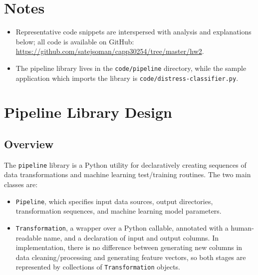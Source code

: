 \documentclass[11pt]{article}
\begin{document}
\begin{titlepage}
\raggedleft\huge\headerfontlt{
\textcolor{darkgray}{Satej Soman\\
CAPP30254: Machine Learning for Public Policy\\
Spring 2019}}

\vspace{240pt}
\Huge\headerfontlt{\textcolor{darkgray}{HW 2\\MACHINE LEARNING PIPELINE}}
\vfill
\normalfont \normalsize
\tableofcontents

\end{titlepage}
\section*{Notes}
\begin{itemize}
\item Representative code snippets are interspersed with analysis and explanations below; all code is available on GitHub: \url{https://github.com/satejsoman/capp30254/tree/master/hw2}.
\item The pipeline library lives in the \texttt{code/pipeline} directory, while the sample application which imports the library is \texttt{code/distress-classifier.py}.
\end{itemize}

\section{Pipeline Library Design}
\subsection{Overview}
The \texttt{pipeline} library is a Python utility for declaratively creating sequences of data transformations and machine learning test/training routines. The two main classes are: 

\begin{itemize}
\item \texttt{Pipeline}, which specifies input data sources, output directories, transformation sequences, and machine learning model parameters.
\item \texttt{Transformation}, a wrapper over a Python callable, annotated with a human-readable name, and a declaration of input and output columns. In implementation, there is no difference between generating new columns in data cleaning/processing and generating feature vectors, so both stages are represented by collections of \texttt{Transformation} objects. 
\end{itemize}
\end{document}
